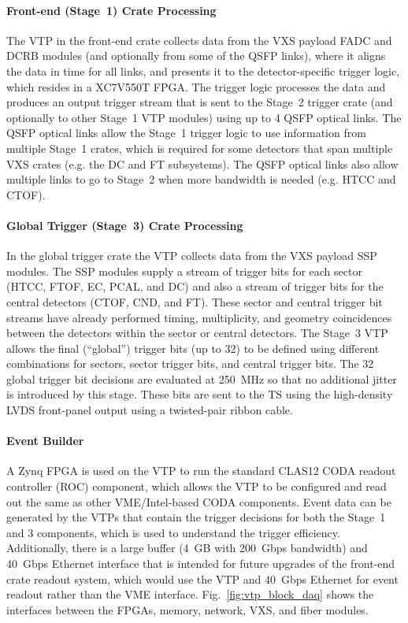 \paragraph{Front-end (Stage~1) Crate Processing}
The VTP in the front-end crate collects data from the VXS payload FADC and DCRB modules (and optionally
from some of the QSFP links), where it aligns the data in time for all links, and presents it to the
detector-specific trigger logic, which resides in a XC7V550T FPGA. The trigger logic processes the data and
produces an output trigger stream that is sent to the Stage~2 trigger crate (and optionally to other Stage~1
VTP modules) using up to 4 QSFP optical links. The QSFP optical links allow the Stage~1 trigger logic to use
information from multiple Stage~1 crates, which is required for some detectors that span multiple VXS crates
(e.g. the DC and FT subsystems). The QSFP optical links also allow multiple links to go to Stage~2 when more
bandwidth is needed (e.g. HTCC and CTOF).

\paragraph{Global Trigger (Stage~3) Crate Processing}
In the global trigger crate the VTP collects data from the VXS payload SSP modules. The SSP modules supply
a stream of trigger bits for each sector (HTCC, FTOF, EC, PCAL, and DC) and also a stream of trigger bits for
the central detectors (CTOF, CND, and FT). These sector and central trigger bit streams have already
performed timing, multiplicity, and geometry coincidences between the detectors within the sector or central
detectors. The Stage~3 VTP allows the final (``global'') trigger bits (up to 32) to be defined using different
combinations for sectors, sector trigger bits, and central trigger bits. The 32 global trigger bit decisions are
evaluated at 250~MHz so that no additional jitter is introduced by this stage. These bits are sent to the TS
using the high-density LVDS front-panel output using a twisted-pair ribbon cable.

\paragraph{Event Builder}
A Zynq FPGA is used on the VTP to run the standard CLAS12 CODA readout controller (ROC) component, which
allows the VTP to be configured and read out the same as other VME/Intel-based CODA components. Event
data can be generated by the VTPs that contain the trigger decisions for both the Stage~1 and 3 components,
which is used to understand the trigger efficiency. Additionally, there is a large buffer (4~GB with 200~Gbps
bandwidth) and 40~Gbps Ethernet interface that is intended for future upgrades of the front-end crate
readout system, which would use the VTP and 40~Gbps Ethernet for event readout rather than the VME
interface. Fig.~\ref{fig:vtp_block_daq} shows the interfaces between the FPGAs, memory, network, VXS, and
fiber modules.

